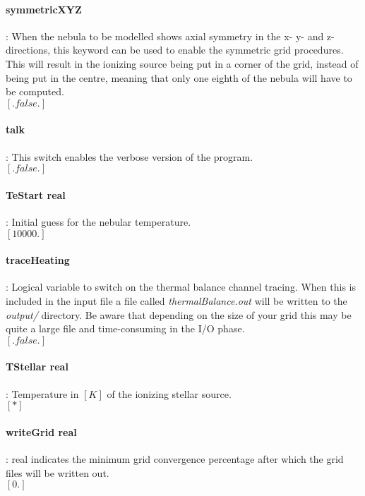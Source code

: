 \documentclass[11pt]{article}
\begin{document}
\paragraph {   symmetricXYZ  }   : When the nebula to be modelled shows axial symmetry in the 
		     x- y- and z-directions, this keyword can be used to enable the
		     symmetric grid procedures. This will result in the ionizing 
		     source being put in a corner of the grid, instead of being put
		     in the centre, meaning that only one eighth of the nebula will
		     have to be computed. \\
		     $[.false.]$\\

\paragraph  {  talk   }          : This switch enables the verbose version of the program.\\
		     $[.false.]$\\


\paragraph   { TeStart real}     : Initial guess for the nebular temperature. \\
		     $[10000.]$\\

\paragraph { traceHeating} : Logical variable to switch on the thermal balance channel tracing. When this is included in the input file a file called {\it thermalBalance.out} will be written to the {\it output/} directory. Be aware that depending on the size of your grid this may be quite a large file and time-consuming in the I/O phase.\\
$[.false.]$\\ 


\paragraph  {  TStellar real  }  : Temperature in $[K]$ of the ionizing stellar source.\\
		     $[*]$\\

\paragraph  {  writeGrid real  } : real indicates the minimum grid convergence percentage
                     after which the grid files will be written out. \\
		     $[0.]$\\
\end{document}
